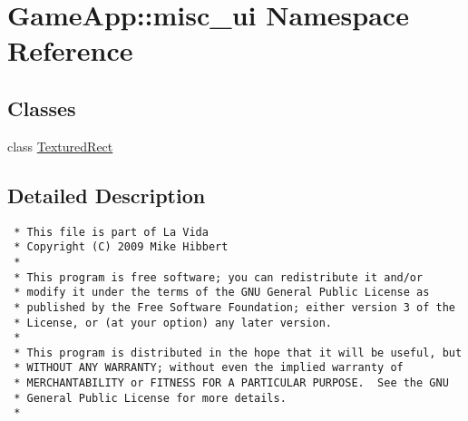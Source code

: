 \hypertarget{namespaceGameApp_1_1misc__ui}{
\section{GameApp::misc\_\-ui Namespace Reference}
\label{namespaceGameApp_1_1misc__ui}
}


\subsection*{Classes}
\begin{CompactItemize}
\item 
class \hyperlink{classGameApp_1_1misc__ui_1_1TexturedRect}{TexturedRect}
\end{CompactItemize}


\subsection{Detailed Description}


\footnotesize\begin{verbatim}
 * This file is part of La Vida
 * Copyright (C) 2009 Mike Hibbert
 *
 * This program is free software; you can redistribute it and/or
 * modify it under the terms of the GNU General Public License as
 * published by the Free Software Foundation; either version 3 of the
 * License, or (at your option) any later version.
 *
 * This program is distributed in the hope that it will be useful, but
 * WITHOUT ANY WARRANTY; without even the implied warranty of
 * MERCHANTABILITY or FITNESS FOR A PARTICULAR PURPOSE.  See the GNU
 * General Public License for more details.
 *
\end{verbatim}
\normalsize
 